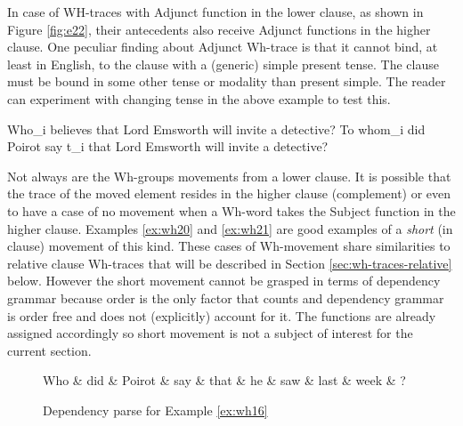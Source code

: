     In case of WH-traces with Adjunct function in the lower clause, as shown in Figure \ref{fig:e22}, their antecedents also receive Adjunct functions in the higher clause. One peculiar finding about Adjunct Wh-trace is that it cannot bind, at least in English, to the clause with a (generic) simple present tense. The clause must be bound in some other tense or modality than present simple. The reader can experiment with changing tense in the above example to test this. 

    \begin{exe}
    	\ex\label{ex:wh20} Who_{i} believes that Lord Emsworth will invite a detective?
    	\ex\label{ex:wh21} To whom_{i} did Poirot say t_{i} that Lord Emsworth will invite a detective?
    \end{exe}

    Not always are the Wh-groups movements from a lower clause. It is possible that the trace of the moved element resides in the higher clause (complement) or even to have a case of no movement when a Wh-word takes the Subject function in the higher clause. Examples \ref{ex:wh20} and \ref{ex:wh21} are good examples of a \textit{short} (in clause) movement of this kind. These cases of Wh-movement share similarities to relative clause Wh-traces that will be described in Section \ref{sec:wh-traces-relative} below. However the short movement cannot be grasped in terms of dependency grammar because order is the only factor that counts and dependency grammar is order free and does not (explicitly) account for it. The functions are already assigned accordingly so short movement is not a subject of interest for the current section.

    \begin{figure}[H]
    	\centering
    	\begin{dependency}
    		\begin{deptext}[]
    			Who \& did \& Poirot \& say \& that \& he \& saw \& last \& week \& ?\\
    		\end{deptext}
    	\end{dependency}
    	\caption{Dependency parse for Example \ref{ex:wh16}}
    	\label{fig:e17}
    \end{figure}

